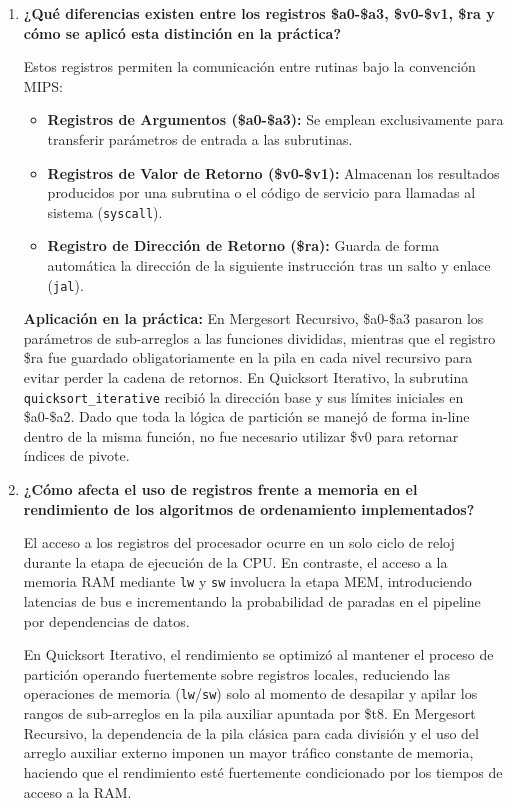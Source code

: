 \documentclass[12pt,letterpaper]{article}
\begin{document}
\begin{enumerate}
    \item \textbf{\large\color{UCBlue}¿Qué diferencias existen entre los registros \$a0-\$a3, \$v0-\$v1, \$ra y cómo se aplicó esta distinción en la práctica?}
    
    \vspace{0.2cm}
    Estos registros permiten la comunicación entre rutinas bajo la convención MIPS:
    \begin{itemize}
        \item \textbf{Registros de Argumentos (\$a0-\$a3):} Se emplean exclusivamente para transferir parámetros de entrada a las subrutinas.
        \item \textbf{Registros de Valor de Retorno (\$v0-\$v1):} Almacenan los resultados producidos por una subrutina o el código de servicio para llamadas al sistema (\texttt{syscall}).
        \item \textbf{Registro de Dirección de Retorno (\$ra):} Guarda de forma automática la dirección de la siguiente instrucción tras un salto y enlace (\texttt{jal}).
    \end{itemize}
    
    \textbf{\color{UCSky}\sffamily Aplicación en la práctica:} En Mergesort Recursivo, \$a0-\$a3 pasaron los parámetros de sub-arreglos a las funciones divididas, mientras que el registro \$ra fue guardado obligatoriamente en la pila en cada nivel recursivo para evitar perder la cadena de retornos. En Quicksort Iterativo, la subrutina \texttt{quicksort\_iterative} recibió la dirección base y sus límites iniciales en \$a0-\$a2. Dado que toda la lógica de partición se manejó de forma in-line dentro de la misma función, no fue necesario utilizar \$v0 para retornar índices de pivote.

    \item \textbf{\large\color{UCBlue}¿Cómo afecta el uso de registros frente a memoria en el rendimiento de los algoritmos de ordenamiento implementados?}
    
    \vspace{0.2cm}
    El acceso a los registros del procesador ocurre en un solo ciclo de reloj durante la etapa de ejecución de la CPU. En contraste, el acceso a la memoria RAM mediante \texttt{lw} y \texttt{sw} involucra la etapa MEM, introduciendo latencias de bus e incrementando la probabilidad de paradas en el pipeline por dependencias de datos.
    
    En Quicksort Iterativo, el rendimiento se optimizó al mantener el proceso de partición operando fuertemente sobre registros locales, reduciendo las operaciones de memoria (\texttt{lw}/\texttt{sw}) solo al momento de desapilar y apilar los rangos de sub-arreglos en la pila auxiliar apuntada por \$t8. En Mergesort Recursivo, la dependencia de la pila clásica para cada división y el uso del arreglo auxiliar externo imponen un mayor tráfico constante de memoria, haciendo que el rendimiento esté fuertemente condicionado por los tiempos de acceso a la RAM.


\end{enumerate}
\end{document}
